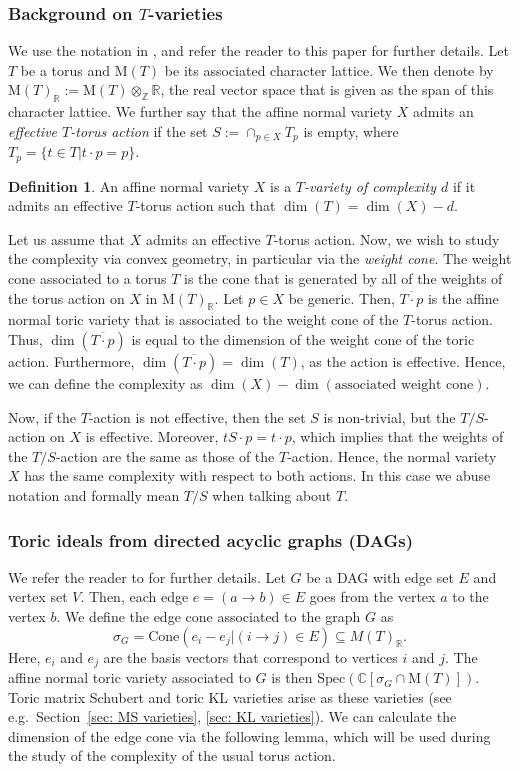 \documentclass[11pt]{amsart}
\theoremstyle{definition}
\theoremstyle{definition}
\newtheorem{definition}[theorem]{Definition}
\theoremstyle{definition}
\theoremstyle{definition}
\begin{document}
\subsubsection*{Background on $T$-varieties} We use the notation in \cite{altmann2012geometry}, and refer the reader to this paper for further details. Let $T$ be a torus and $\mathrm{M}(T)$ be its associated character lattice. We then denote by $\mathrm{M}(T)_{\mathbb{R}}:= \mathrm{M}(T) \otimes_{\mathbb Z} \mathbb R$, the real vector space that is given as the span of this character lattice. We further say that the affine normal variety $X$ admits an \emph{effective $T$-torus action} if the set $S := \cap_{p\in X}T_p$ is empty, where $T_p = \{t\in T|t\cdot p=p\}$.  
\begin{definition}
    An affine normal variety $X$ is a \emph{$T$-variety of complexity $d$} if it admits an effective $T$-torus action such that $\dim(T) = \dim(X)-d.$
\end{definition}
\noindent Let us assume that $X$ admits an effective $T$-torus action. Now, we wish to study the complexity via convex geometry, in particular via the \emph{weight cone}. The weight cone associated to a torus $T$ is the cone that is generated by all of the weights of the torus action on $X$ in $\mathrm{M}(T)_{\mathbb{R}}$. Let $p\in X$ be generic. Then, $\overline{T\cdot p}$ is the affine normal toric variety that is associated to the weight cone of the $T$-torus action. Thus, $\dim(\overline{T\cdot p})$ is equal to the dimension of the weight cone of the toric action. Furthermore, $\dim(\overline{T\cdot p}) = \dim(T)$, as the action is effective. Hence, we can define the complexity as
$\dim(X) - \dim(\text{associated weight cone}).$

Now, if the $T$-action is not effective, then the set $S$ is non-trivial, but the $T/S$-action on $X$ is effective. Moreover, $tS\cdot p = t\cdot p$, which implies that the weights of the $T/S$-action are the same as those of the $T$-action. Hence, the normal variety $X$ has the same complexity with respect to both actions. In this case we abuse notation and formally mean $T/S$ when talking about $T$.

\subsubsection*{Toric ideals from directed acyclic graphs (DAGs)} \noindent We refer the reader to \cite{gitler2010ring,kara2023rigid} for further details. Let $G$ be a DAG with edge set $E$ and vertex set $V$. Then, each edge $e=(a\rightarrow b)\in E$ goes from the vertex $a$ to the vertex $b$.  
We define the edge cone associated to the graph $G$ as 
$$\sigma_G = \mathrm{Cone}(e_i-e_j|(i\rightarrow j)\in E) \subseteq M(T)_{\mathbb R}.$$
Here, $e_i$ and $e_j$ are the basis vectors that correspond to vertices $i$ and $j$. The affine normal toric variety associated to $G$ is then $\mathrm{Spec}(\mathbb{C}[\sigma_G \cap \mathrm{M}(T)])$. Toric matrix Schubert and toric KL varieties arise as these varieties (see e.g.\ Section~\ref{sec: MS varieties}, \ref{sec: KL varieties}). We can calculate the dimension of the edge cone via the following lemma, which will be used during the study of the complexity of the usual torus action.
\end{document}
